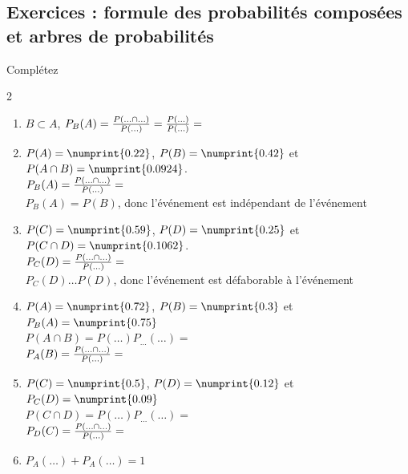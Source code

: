 \documentclass[main.tex]{subfiles}
\begin{document}

\newpage 
{}  
\pagestyle{scrheadings} %
\onehalfspacing
\subsection{Exercices : formule des probabilités composées et arbres de probabilités}


\begin{exercise}\label{chapter02:exercise:B01}  Complétez\vspace{-.75em}
	\begin{spacing}{2}
		\begin{enumerate}[label=\arabic*), leftmargin=*]
			\item $B\subset A$, $P_B(A)=\frac{P(\ldots \cap \ldots)}{P(\ldots)}=\frac{P(\ldots)}{P(\ldots)}=\dotfill $
			\item  $P(A)=\numprint{0.22}$, $P(B)=\numprint{0.42}$ et $P(A\cap B)=\numprint{0.0924}$.\\
			$P_B(A)=\frac{P(\ldots\cap \ldots)}{P(\ldots)}=\dotfill $\\
			$P_B(A)=P(B)$, donc  l'événement \dotfill est indépendant de l'événement \dotfill
			\item $P(C)=\numprint{0.59}$, $P(D)=\numprint{0.25}$ et $P(C\cap D)=\numprint{0.1062}$.\\
			$P_C(D)=\frac{P(\ldots\cap \ldots)}{P(\ldots)}=\dotfill $\\
			$P_C(D)\ldots P(D)$, donc  l'événement \dotfill est défaborable à l'événement \dotfill
			\item $P(A)=\numprint{0.72}$, $P(B)=\numprint{0.3}$ et $P_B(A)=\numprint{0.75}$\\
			$P(A\cap B)=P(\ldots) P_{\ldots} (\ldots) =$\dotfill \\
			$P_A(B)=\frac{P(\ldots\cap \ldots)}{P(\ldots)}=\dotfill $
			\item $P(C)=\numprint{0.5}$, $P(D)=\numprint{0.12}$ et $P_C(D)=\numprint{0.09}$\\
			$P(C\cap D)=P(\ldots) P_{\ldots} (\ldots) =$\dotfill \\
			$P_D(C)=\frac{P(\ldots\cap \ldots)}{P(\ldots)}=\dotfill $
			\item $P_A(\ldots)+P_A(\ldots)= 1$
		\end{enumerate}
	\end{spacing}\vspace{-0.75em}
\end{exercise}  
\end{document}
